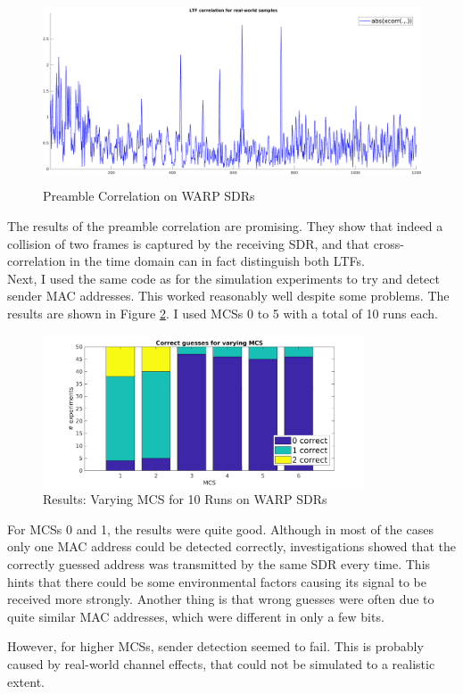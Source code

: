 \begin{figure}[H]
	\centering
  \includegraphics[height=5.5cm]{gfx/plots/warp-preamble}
	\caption{Preamble Correlation on WARP SDRs}
	\label{fig:warp_preamble_corr}
\end{figure}

The results of the preamble correlation are promising. They show that indeed a collision of two frames is captured by the receiving \gls{SDR}, and that cross-correlation in the time domain can in fact distinguish both \glspl{LTF}.\\

Next, I used the same code as for the simulation experiments to try and detect sender \gls{MAC} addresses. This worked reasonably well despite some problems. The results are shown in Figure \ref{fig:warp-mcs-results}. I used \glspl{MCS} 0 to 5 with a total of 10 runs each.

\begin{figure}[H]
	\centering
	\includegraphics[height=4.5cm]{gfx/plots/warp-mcs}
	\caption{Results: Varying MCS for 10 Runs on WARP SDRs}
	\label{fig:warp-mcs-results}
\end{figure}

For \glspl{MCS} 0 and 1, the results were quite good. Although in most of the cases only one \gls{MAC} address could be detected correctly, investigations showed that the correctly guessed address was transmitted by the same \gls{SDR} every time. This hints that there could be some environmental factors causing its signal to be received more strongly. Another thing is that wrong guesses were often due to quite similar \gls{MAC} addresses, which were different in only a few bits.

However, for higher \glspl{MCS}, sender detection seemed to fail. This is probably caused by real-world channel effects, that could not be simulated to a realistic extent.

